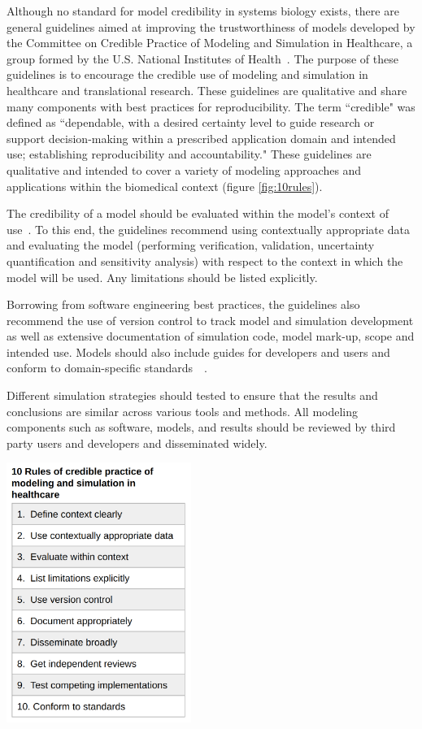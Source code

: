 \documentclass[12pt]{report}
\begin{document}
Although no standard for model credibility in systems biology exists, there are general guidelines aimed at improving the trustworthiness of models developed by the Committee on Credible Practice of Modeling and Simulation in Healthcare, a group formed by the U.S. National Institutes of Health~\cite{erdemir_credible_2020}. The purpose of these guidelines is to encourage the credible use of modeling and simulation in healthcare and translational research. These guidelines are qualitative and share many components with best practices for reproducibility. The term ``credible" was defined as  ``dependable, with a desired certainty level to guide research or support decision-making within a prescribed application domain and intended use; establishing reproducibility and accountability." These guidelines are qualitative and intended to cover a variety of modeling approaches and applications within the biomedical context (figure \ref{fig:10rules}). 

The credibility of a model should be evaluated within the model's context of use~\cite{erdemir_credible_2020}.
 To this end, the guidelines recommend using contextually appropriate data and evaluating the model (performing verification, validation, uncertainty quantification and sensitivity analysis) with respect to the context in which the model will be used. Any limitations should be listed explicitly. 

Borrowing from software engineering best practices, the guidelines also recommend the use of version control to track model and simulation development as well as extensive documentation of simulation code, model mark-up, scope and intended use. Models should also include guides for developers and users and conform to domain-specific standards~~\cite{erdemir_credible_2020}.

Different simulation strategies should tested to ensure that the results and conclusions are similar across various tools and methods. All modeling components such as software, models, and results should be reviewed by third party users and developers and disseminated widely.  


\begin{center}
    \captionsetup{type=figure}
    \includegraphics[width=6cm]{images/10rules.png}
    \label{fig:10rules}
\end{center}
\end{document}
